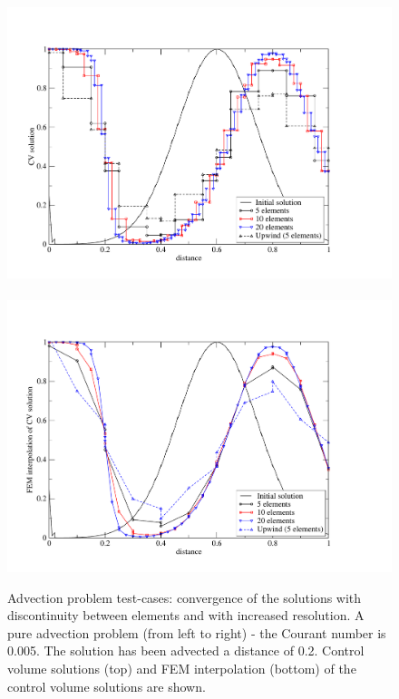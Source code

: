 \begin{figure}[h]
\vbox{\vspace{-2cm}
\hbox{\hspace{-.5cm}
\includegraphics[width=14.0cm,height=10.cm]{diagrams/converg-cv}}
\vspace{-.5cm}
\hbox{\hspace{-.5cm}
\includegraphics[width=14.0cm,height=10.cm]{diagrams/converg-fem}}
}\vspace{-.3cm}
\caption{Advection problem test-cases: convergence of the solutions
  with discontinuity between elements and with increased resolution. A
  pure advection problem (from left to right) - the Courant number is
  0.005. The solution has been advected a distance of 0.2. Control
  volume solutions (top) and FEM interpolation (bottom) of the control
  volume solutions are shown. \label{converg}}
\end{figure}


